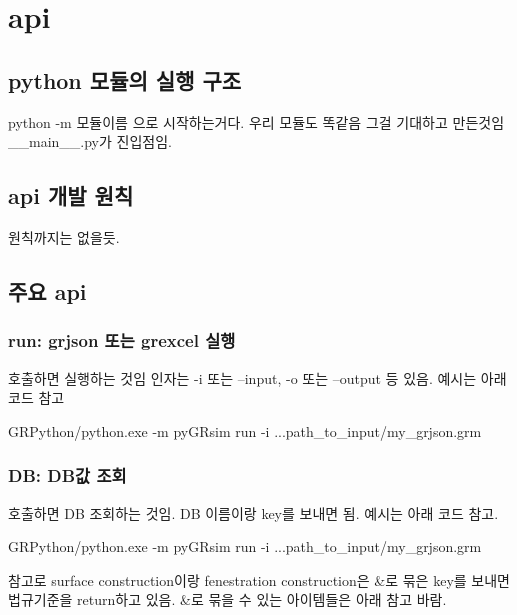 
\section{api}
\subsection{python 모듈의 실행 구조}
python -m 모듈이름 으로 시작하는거다. 우리 모듈도 똑같음 그걸 기대하고 만든것임 \_\_main\_\_.py가 진입점임.

\subsection{api 개발 원칙}
원칙까지는 없을듯.

\subsection{주요 api}

\subsubsection{run: grjson 또는 grexcel 실행}
호출하면 실행하는 것임 인자는 -i 또는 --input, -o 또는 --output 등 있음. 예시는 아래 코드 참고
\begin{tcolorbox}[colback=gray!10, colframe=gray!80, boxrule=0.5pt, left=1em, right=1em]
GRPython/python.exe -m pyGRsim run -i ...path\_to\_input/my\_grjson.grm
\end{tcolorbox}

\subsubsection{DB: DB값 조회}
호출하면 DB 조회하는 것임. DB 이름이랑 key를 보내면 됨. 예시는 아래 코드 참고.

\begin{tcolorbox}[colback=gray!10, colframe=gray!80, boxrule=0.5pt, left=1em, right=1em]
GRPython/python.exe -m pyGRsim run -i ...path\_to\_input/my\_grjson.grm
\end{tcolorbox}

참고로 surface construction이랑 fenestration construction은 \&로 묶은 key를 보내면 법규기준을 return하고 있음. \&로 묶을 수 있는 아이템들은 아래 참고 바람.

